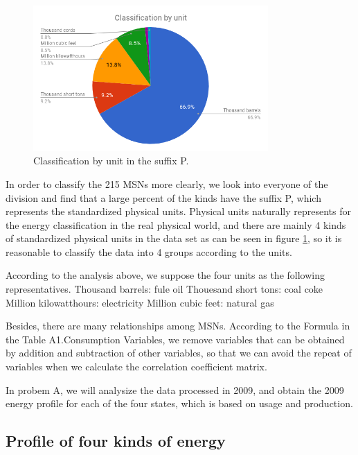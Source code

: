 \documentclass[a4paper,11pt]{article}
\begin{document}
\begin{figure}[!h]%
    \centering 
    \includegraphics[width=0.8\textwidth]{./Pic/classification_by_unit.png}
    \caption{Classification by unit in the suffix P.}
    \label{fig:classification_by_unit}  
\end{figure}

\par In order to classify the 215 MSNs more clearly, we look into everyone of the division and find that a large percent of the kinds have the suffix P, which represents the standardized physical units. Physical units naturally represents for the energy classification in the real physical world, and there are mainly 4 kinds of standardized physical units in the data set as can be seen in figure \ref{fig:classification_by_unit}, so it is reasonable to classify the data into 4 groups according to the units.
\par According to the analysis above, we suppose the four units as the following representatives.
Thousand barrels: fule oil
Thouesand short tons: coal coke
Million kilowatthours: electricity
Million cubic feet: natural gas
\par Besides, there are many relationships among MSNs. According to the Formula in the Table A1.Consumption Variables,\cite{4} we remove variables that can be obtained by addition and subtraction of other variables, so that we can avoid the repeat of variables when we calculate the correlation coefficient matrix. 
\par In probem A, we will analysize the data processed in 2009, and obtain the 2009 energy profile for each of the four states, which is based on usage and production.

\subsection{Profile of four kinds of energy}
\end{document}
